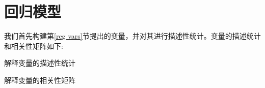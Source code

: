 \section{回归模型}
我们首先构建第\ref{reg vars}节提出的变量，并对其进行描述性统计。变量的描述统计和相关性矩阵如下:
\newpage
{}
\begin{landscape}
    
\begin{table}[H]
    \tiny
    \caption{解释变量的描述性统计}
    
\end{table}
\begin{table}[H]
    \tiny
    \caption{解释变量的相关性矩阵}
        
\end{table}
\end{landscape}

